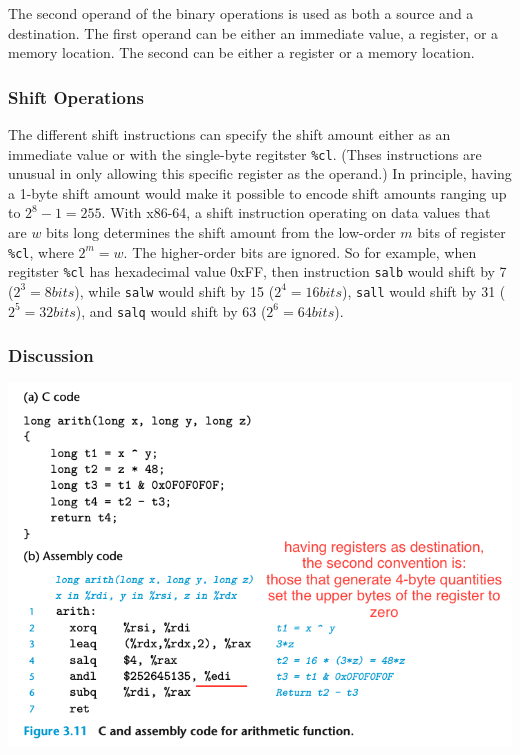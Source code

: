 \documentclass[11pt]{article}
\begin{document}
The second operand of the binary operations is used as both a source and a destination. The first operand can be either an immediate value, a register, or a memory location. The second can be either a register or a memory location.\\


\subsubsection{Shift Operations}
\label{sec:org89aa8a1}
The different shift instructions can specify the shift amount either as an immediate value or with the single-byte regitster \texttt{\%cl}. (Thses instructions are unusual in only allowing this specific register as the operand.) In principle, having a 1-byte shift amount would make it possible to encode shift amounts ranging up to \(2^8-1=255\). With x86-64, a shift instruction operating on data values that are \(w\) bits long determines the shift amount from the low-order \(m\) bits of register \texttt{\%cl}, where \(2^m = w\). The higher-order bits are ignored. So for example, when regitster \texttt{\%cl} has hexadecimal value 0xFF, then instruction \texttt{salb} would shift by 7 (\(2^3=8 bits\)), while \texttt{salw} would shift by 15 (\(2^4=16 bits\)), \texttt{sall} would shift by 31 (\(2^5=32 bits\)), and \texttt{salq} would shift by 63 (\(2^6=64 bits\)).\\


\subsubsection{Discussion}
\label{sec:orgac5d993}

\begin{center}
\includegraphics[width=.9\linewidth]{pics/c-and-assembly-code-for-arithmetic-function.png}
\end{center}
\end{document}
